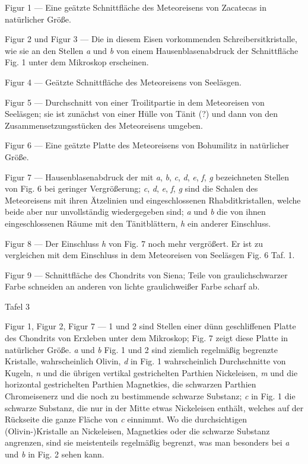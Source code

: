 \documentclass[a4paper, 11pt, oneside]{article}
\begin{document}
Figur 1 --- Eine geätzte Schnittfläche des Meteoreisens von Zacatecas in natürlicher Größe.

Figur 2 und Figur 3 --- Die in diesem Eisen vorkommenden Schreibersitkristalle, wie sie an den Stellen \emph{a} und \emph{b} von einem Hausenblasenabdruck der Schnittfläche Fig. 1 unter dem Mikroskop erscheinen.

Figur 4 --- Geätzte Schnittfläche des Meteoreisens von Seeläsgen.

Figur 5 --- Durchschnitt von einer Troilitpartie in dem Meteoreisen von Seeläsgen; sie ist zunächst von einer Hülle von Tänit (?) und dann von den Zusammensetzungsstücken des Meteoreisens umgeben.

Figur 6 --- Eine geätzte Platte des Meteoreisens von Bohumilitz in natürlicher Größe.

Figur 7 --- Hausenblasenabdruck der mit \emph{a}, \emph{b}, \emph{c}, \emph{d}, \emph{e}, \emph{f}, \emph{g} bezeichneten Stellen von Fig. 6 bei geringer Vergrößerung; \emph{c}, \emph{d}, \emph{e}, \emph{f}, \emph{g} sind die Schalen des Meteoreisens mit ihren Ätzelinien und eingeschlossenen Rhabditkristallen, welche beide aber nur unvollständig wiedergegeben sind; \emph{a} und \emph{b} die von ihnen eingeschlossenen Räume mit den Tänitblättern, \emph{h} ein anderer Einschluss.

Figur 8 --- Der Einschluss \emph{h} von Fig. 7 noch mehr vergrößert. Er ist zu vergleichen mit dem Einschluss in dem Meteoreisen von Seeläsgen Fig. 6 Taf. 1.

Figur 9 --- Schnittfläche des Chondrits von Siena; Teile von graulichschwarzer Farbe schneiden an anderen von lichte graulichweißer Farbe scharf ab.

Tafel 3

Figur 1, Figur 2, Figur 7 --- 1 und 2 sind Stellen einer dünn geschliffenen Platte des Chondrits von Erxleben unter dem Mikroskop; Fig. 7 zeigt diese Platte in natürlicher Größe. \emph{a} und \emph{b} Fig. 1 und 2 sind ziemlich regelmäßig begrenzte Kristalle, wahrscheinlich Olivin, \emph{d} in Fig. 1 wahrscheinlich Durchschnitte von Kugeln, \emph{n} und die übrigen vertikal gestrichelten Parthien Nickeleisen, \emph{m} und die horizontal gestrichelten Parthien Magnetkies, die schwarzen Parthien Chromeisenerz und die noch zu bestimmende schwarze Substanz; \emph{c} in Fig. 1 die schwarze Substanz, die nur in der Mitte etwas Nickeleisen enthält, welches auf der Rückseite die ganze Fläche von \emph{c} einnimmt. Wo die durchsichtigen (Olivin-)Kristalle an Nickeleisen, Magnetkies oder die schwarze Substanz angrenzen, sind sie meistenteils regelmäßig begrenzt, was man besonders bei \emph{a} und \emph{b} in Fig. 2 sehen kann.
\end{document}

